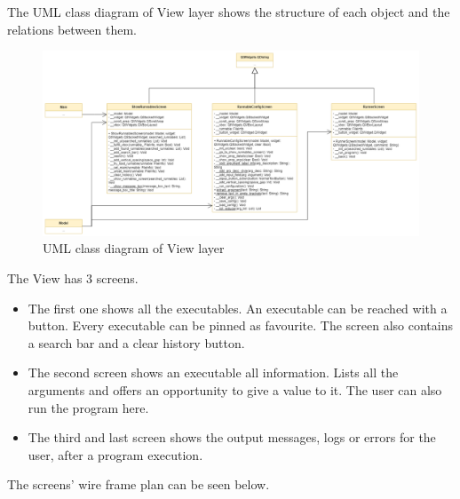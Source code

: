 \documentclass{article}
\begin{document}
The UML class diagram of View layer shows the structure of each object and the relations between them.

\begin{figure}[h]
    \centering
    \includegraphics[width=1\linewidth]{img/class_diagram_view.drawio.png}
    \caption{UML class diagram of View layer}
    \label{fig:enter-label}
\end{figure}

The View has 3 screens.

\begin{itemize}
    \item The first one shows all the executables. An executable can be reached with a button. Every executable can be pinned as favourite. The screen also contains a search bar and a clear history button.
    \item The second screen shows an executable all information. Lists all the arguments and offers an opportunity to give a value to it. The user can also run the program here.
    \item The third and last screen shows the output messages, logs or errors for the user, after a program execution.
\end{itemize}

The screens' wire frame plan can be seen below.
\end{document}
